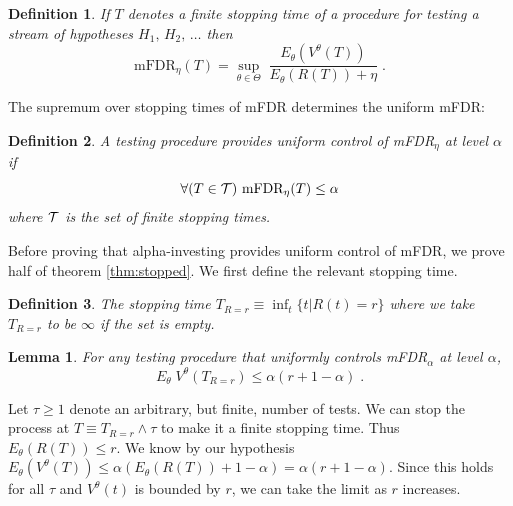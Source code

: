 \documentclass[12pt]{article}
\newtheorem{lemma}{Lemma}
\newcommand{\QED}{\frame{\rule{0pt}{6pt}\rule{6pt}{0pt}}}
\newtheorem{definition}{Definition}
\begin{document}
\begin{definition}
 If  $T$ denotes a finite stopping time of a procedure for testing a 
 stream of hypotheses $H_1,\,H_2,\, \ldots$ then
\begin{displaymath}
  \mbox{mFDR}_\eta(T) 
   = \sup_{\theta \in \Theta} \; \frac{E_\theta \left(V^\theta(T)\right)}
                                              {E_\theta \left(R(T) \right) + \eta }\;.
\end{displaymath}
\end{definition}

\noindent 
The supremum over stopping times of mFDR  determines the uniform mFDR:

\begin{definition}
A testing procedure provides {\em uniform control} of mFDR$_\eta$ at level $\alpha$ if 
\begin{equation}
\forall(T \in {\cal T}) \,\,  \mbox{mFDR}_\eta(T) \le \alpha
\label{eq:def:sFDR}
\end{equation}
where ${\cal T}$ is the set of finite stopping times.
\end{definition}

Before proving that alpha-investing provides uniform
 control of mFDR, we prove half of theorem \ref{thm:stopped}.  
 We first define the relevant stopping time.
\begin{definition}
The stopping time $T_{R=r} \equiv \inf_{t}\{t|R(t) = r\}$ where
 we take $T_{R=r}$ to be $\infty$ if the set is empty.
\end{definition}

\begin{lemma}
For any testing procedure that uniformly controls mFDR$_\alpha$ 
at level $\alpha$,
\begin{displaymath}
   E _\theta\; V^\theta(T_{R=r}) \le \alpha (r + 1 - \alpha) \;. 
\end{displaymath}
\end{lemma}

Let $\tau \ge 1$ denote an arbitrary, but finite, number of tests.  
We can stop the process at $T \equiv T_{R=r} \wedge \tau$ to make it
 a finite stopping time. Thus $E_\theta(R(T)) \le r$.  We know by
 our hypothesis $E_\theta ( V^\theta(T)) \le \alpha \left({E_\theta(R(T) ) +
 1 - \alpha }\right) =  \alpha(r+ 1 - \alpha)$.  Since this holds for all $\tau$ and
 $V^\theta(t)$ is bounded by $r$, we can take the limit as $r$ increases.

\hfill \QED
\end{document}
